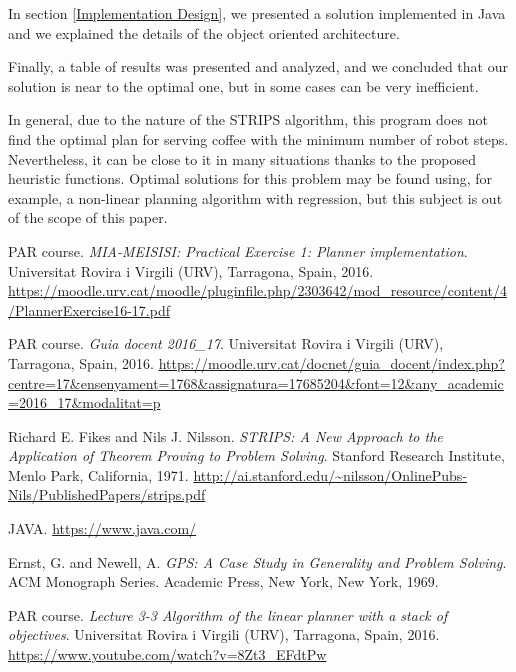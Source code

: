 \documentclass[12pt,a4paper,oneside]{article}
\numberwithin{equation}{section}
\numberwithin{equation}{section}
\theoremstyle{definition}
\begin{document}
In section \ref{Implementation Design},  we presented a solution implemented in Java and we explained the details of the object oriented architecture.

Finally, a table of results was presented and analyzed, and we concluded that our solution is near to the optimal one, but in some cases can be very inefficient.


In general, due to the nature of the STRIPS algorithm, this program does not find the optimal plan for serving coffee with the minimum number of robot steps. Nevertheless, it can be close to it in many situations thanks to the proposed heuristic functions. Optimal solutions for this problem may be found using, for example, a non-linear planning algorithm with regression, but this subject is out of the scope of this paper.



\newpage

\begin{thebibliography}{25}
	
	
	 PAR course. \textsl{MIA-MEISISI: Practical Exercise 1: Planner implementation}. Universitat Rovira i Virgili (URV), Tarragona, Spain, 2016. \url{https://moodle.urv.cat/moodle/pluginfile.php/2303642/mod_resource/content/4/PlannerExercise16-17.pdf}
	
	
	 PAR course. \textsl{Guia docent 2016\_17}. Universitat Rovira i Virgili (URV), Tarragona, Spain, 2016. \url{https://moodle.urv.cat/docnet/guia_docent/index.php?centre=17&ensenyament=1768&assignatura=17685204&font=12&any_academic=2016_17&modalitat=p}
	
	
	 Richard E. Fikes and Nils J. Nilsson. \textsl{STRIPS: A New Approach to the
		Application of Theorem Proving to Problem Solving}. Stanford Research Institute, Menlo Park, California, 1971. \url{http://ai.stanford.edu/~nilsson/OnlinePubs-Nils/PublishedPapers/strips.pdf}
	
	
	 JAVA. \url{https://www.java.com/}
	
	
	 Ernst, G. and Newell, A. \textsl{GPS: A Case Study in Generality and Problem Solving}. ACM Monograph Series. Academic Press, New York, New York, 1969.
	
	
	 PAR course. \textsl{Lecture 3-3 Algorithm of the linear planner with a stack of objectives}. Universitat Rovira i Virgili (URV), Tarragona, Spain, 2016. \url{https://www.youtube.com/watch?v=8Zt3_EFdtPw}
	
\end{thebibliography}
\end{document}
